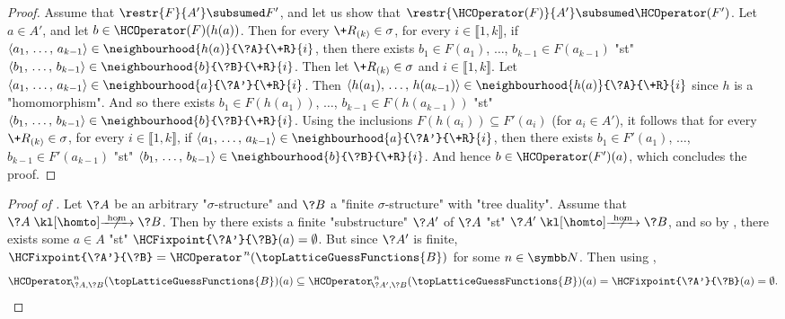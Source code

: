 \begin{proof}
	Assume that $\restr{F}{A'} \subsumed F'$, and let us show that 
	$\restr{\HCOperator(F)}{A'} \subsumed \HCOperator(F')$.
	Let $a \in A'$, and let $b \in \HCOperator(F)(h(a))$.
	Then for every $\+R_{(k)} \in \sigma$,
	for every $i \in \lBrack 1,k\rBrack$,
	if $\langle a_1,\, \hdots,\, a_{k-1} \rangle \in \neighbourhood{h(a)}{\?A}{\+R}{i}$,
	then there exists $b_1 \in F(a_1)$, $\hdots$, $b_{k-1} \in F(a_{k-1})$ "st" 
	$\langle b_1,\, \hdots,\, b_{k-1} \rangle \in \neighbourhood{b}{\?B}{\+R}{i}$.
	Then let $\+R_{(k)} \in \sigma$ and $i \in \lBrack 1,k\rBrack$.
	Let $\langle a_1,\, \hdots,\, a_{k-1} \rangle \in \neighbourhood{a}{\?A'}{\+R}{i}$.
	Then $\langle h(a_1),\, \hdots,\, h(a_{k-1}) \rangle \in \neighbourhood{h(a)}{\?A}{\+R}{i}$
	since $h$ is a "homomorphism". And so there exists
	$b_1 \in F(h(a_1))$, $\hdots$, $b_{k-1} \in F(h(a_{k-1}))$ "st" 
	$\langle b_1,\, \hdots,\, b_{k-1} \rangle \in \neighbourhood{b}{\?B}{\+R}{i}$.
	Using the inclusions $F(h(a_i)) \subseteq F'(a_i)$ (for $a_i \in A'$), it follows that
	for every $\+R_{(k)} \in \sigma$, for every $i \in \lBrack 1,k\rBrack$,
	if $\langle a_1,\, \hdots,\, a_{k-1} \rangle \in \neighbourhood{a}{\?A'}{\+R}{i}$, then
	there exists $b_1 \in F'(a_1)$, $\hdots$, $b_{k-1} \in F'(a_{k-1})$
	"st" $\langle b_1,\, \hdots,\, b_{k-1} \rangle \in \neighbourhood{b}{\?B}{\+R}{i}$.
	And hence $b \in \HCOperator(F')(a)$, which concludes the proof.
\end{proof}

\begin{proof}[Proof of ]
	Let $\?A$ be an arbitrary "$\sigma$-structure" and $\?B$ a "finite $\sigma$-structure"
	with "tree duality". Assume that $\?A \nothomto \?B$.
	Then by  there exists a finite "substructure" $\?A'$
	of $\?A$ "st" $\?A' \nothomto \?B$,
	and so by ,
	there exists some $a\in A$ "st" $\HCFixpoint{\?A'}{\?B}(a) = \emptyset$.
	But since $\?A'$ is finite, $\HCFixpoint{\?A'}{\?B} = \HCOperator^{\,n}(\topLatticeGuessFunctions{B})$ for some $n\in\N$. Then using ,
	\[
		\HCOperator_{\!\?A,\?B}^{\,n}(\topLatticeGuessFunctions{B})(a)
		\subseteq \HCOperator_{\!\?A',\?B}^{\,n}(\topLatticeGuessFunctions{B})(a)
		= \HCFixpoint{\?A'}{\?B}(a)
		= \emptyset.\qedhere
	\]
\end{proof}

